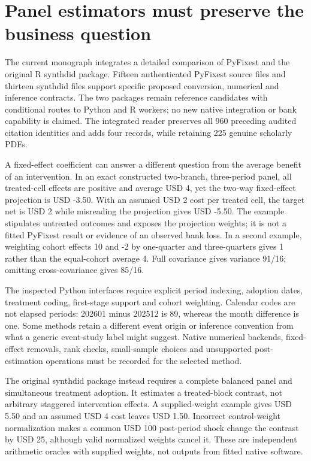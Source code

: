 \hypertarget{panel-estimators-must-preserve-the-business-question}{%
\section{Panel estimators must preserve the business
question}\label{panel-estimators-must-preserve-the-business-question}}

The current monograph integrates a detailed comparison of PyFixest and
the original R synthdid package. Fifteen authenticated PyFixest source
files and thirteen synthdid files support specific proposed conversion,
numerical and inference contracts. The two packages remain reference
candidates with conditional routes to Python and R workers; no new
native integration or bank capability is claimed. The integrated reader
preserves all 960 preceding audited citation identities and adds four
records, while retaining 225 genuine scholarly PDFs.
\citep{sp23panel_reader,exec23_pyfixest_reuse_source,exec23_synthdid_reuse_source}

A fixed-effect coefficient can answer a different question from the
average benefit of an intervention. In an exact constructed two-branch,
three-period panel, all treated-cell effects are positive and average
USD 4, yet the two-way fixed-effect projection is USD -3.50. With an
assumed USD 2 cost per treated cell, the target net is USD 2 while
misreading the projection gives USD -5.50. The example stipulates
untreated outcomes and exposes the projection weights; it is not a
fitted PyFixest result or evidence of an observed bank loss. In a second
example, weighting cohort effects 10 and -2 by one-quarter and
three-quarters gives 1 rather than the equal-cohort average 4. Full
covariance gives variance 91/16; omitting cross-covariance gives 85/16.
\citep{exec23_pyfixest_reference}

The inspected Python interfaces require explicit period indexing,
adoption dates, treatment coding, first-stage support and cohort
weighting. Calendar codes are not elapsed periods: 202601 minus 202512
is 89, whereas the month difference is one. Some methods retain a
different event origin or inference convention from what a generic
event-study label might suggest. Native numerical backends, fixed-effect
removals, rank checks, small-sample choices and unsupported
post-estimation operations must be recorded for the selected method.
\citep{exec23_pyfixest_reuse_source}

The original synthdid package instead requires a complete balanced panel
and simultaneous treatment adoption. It estimates a treated-block
contrast, not arbitrary staggered intervention effects. A
supplied-weight example gives USD 5.50 and an assumed USD 4 cost leaves
USD 1.50. Incorrect control-weight normalization makes a common USD 100
post-period shock change the contrast by USD 25, although valid
normalized weights cancel it. These are independent arithmetic oracles
with supplied weights, not outputs from fitted native software.
\citep{exec23_synthdid_reuse_source,exec23_synthdid_reference}

